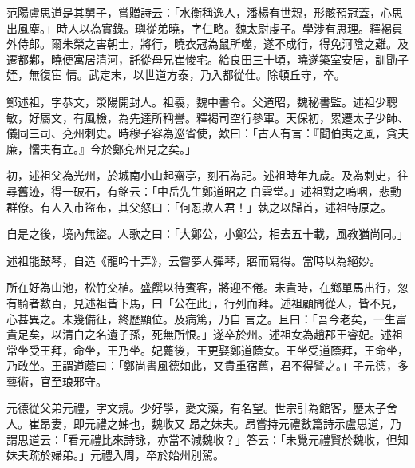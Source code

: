 \begin{pinyinscope}
 范陽盧思道是其舅子，嘗贈詩云：「水衡稱逸人，潘楊有世親，形骸預冠蓋，心思出風塵。」時人以為實錄。璵從弟曉，字仁略。魏太尉虔子。學涉有思理。釋褐員外侍郎。爾朱榮之害朝士，將行，曉衣冠為鼠所噬，遂不成行，得免河陰之難。及遷都鄴，曉便寓居清河，託從母兄崔悛宅。給良田三十頃，曉遂築室安居，訓勖子姪，無復宦
 情。武定末，以世道方泰，乃入都從仕。除頓丘守，卒。



 鄭述祖，字恭文，滎陽開封人。祖羲，魏中書令。父道昭，魏秘書監。述祖少聰敏，好屬文，有風檢，為先達所稱譽。釋褐司空行參軍。天保初，累遷太子少師、儀同三司、兗州刺史。時穆子容為巡省使，歎曰：「古人有言：『聞伯夷之風，貪夫廉，懦夫有立。』今於鄭兗州見之矣。」



 初，述祖父為光州，於城南小山起齋亭，刻石為記。述祖時年九歲。及為刺史，往尋舊迹，得一破石，有銘云：「中岳先生鄭道昭之
 白雲堂。」述祖對之嗚咽，悲動群僚。有人入市盜布，其父怒曰：「何忍欺人君！」執之以歸首，述祖特原之。



 自是之後，境內無盜。人歌之曰：「大鄭公，小鄭公，相去五十載，風教猶尚同。」



 述祖能鼓琴，自造《龍吟十弄》，云嘗夢人彈琴，寤而寫得。當時以為絕妙。



 所在好為山池，松竹交植。盛饌以待賓客，將迎不倦。未貴時，在鄉單馬出行，忽有騎者數百，見述祖皆下馬，曰「公在此」，行列而拜。述祖顧問從人，皆不見，心甚異之。未幾備征，終歷顯位。及病篤，乃自
 言之。且曰：「吾今老矣，一生富貴足矣，以清白之名遺子孫，死無所恨。」遂卒於州。述祖女為趙郡王睿妃。述祖常坐受王拜，命坐，王乃坐。妃薨後，王更娶鄭道蔭女。王坐受道蔭拜，王命坐，乃敢坐。王謂道蔭曰：「鄭尚書風德如此，又貴重宿舊，君不得譬之。」子元德，多藝術，官至琅邪守。



 元德從父弟元禮，字文規。少好學，愛文藻，有名望。世宗引為館客，歷太子舍人。崔昂妻，即元禮之姊也，魏收又
 昂之妹夫。昂嘗持元禮數篇詩示盧思道，乃謂思道云：「看元禮比來詩詠，亦當不減魏收？」答云：「未覺元禮賢於魏收，但知妹夫疏於婦弟。」元禮入周，卒於始州別駕。



\end{pinyinscope}